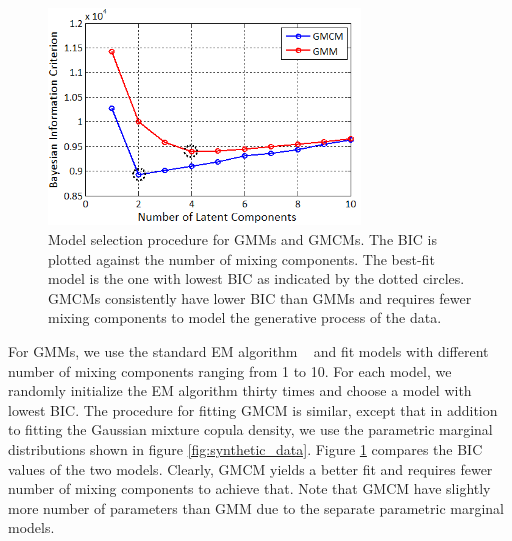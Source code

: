 \documentclass[]{article}
\begin{document}
\begin{figure}[h]
\includegraphics[width= 235pt,keepaspectratio=true]{BIC_GMCM_GMM}
\caption{Model selection procedure for GMMs and GMCMs. The BIC is plotted against the number of mixing components. The best-fit model is the one with lowest BIC as indicated by the dotted circles. GMCMs consistently have lower BIC than GMMs and requires fewer mixing components to model the generative process of the data.}
\label{fig:BIC_comparison}
\end{figure}
For GMMs, we use the standard EM algorithm ~\cite{Bilmes98agentle} and fit models with different number of mixing components ranging from 1 to 10. For each model, we randomly initialize the EM algorithm thirty times and choose a model with lowest BIC. The procedure for fitting GMCM is similar, except that in addition to fitting the Gaussian mixture copula density, we use the parametric marginal distributions shown in figure \ref{fig:synthetic_data}. Figure \ref{fig:BIC_comparison} compares the BIC values of the two models. Clearly, GMCM yields a better fit and requires fewer number of mixing components to achieve that. Note that GMCM have slightly more number of parameters than GMM due to the separate parametric marginal models. 
\end{document}
